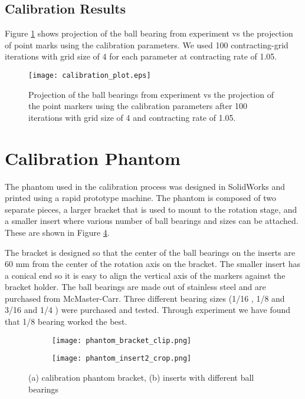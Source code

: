 \subsection{Calibration Results}
Figure \ref{fig:calibration_plot} shows projection of the ball bearing from experiment vs the projection of point marks using the calibration parameters.  We used 100 contracting-grid iterations with grid size of 4 for each parameter at contracting rate of 1.05.

\begin{figure}[ht]
\texttt{[image: calibration\_plot.eps]}
\label{fig:calibration_plot}
\caption{Projection of the ball bearings from experiment vs the projection of the point markers using the calibration parameters after 100 iterations with grid size of 4 and contracting rate of 1.05.}
\end{figure}


\section{Calibration Phantom}
The phantom used in the calibration process was designed in SolidWorks and printed using a rapid prototype machine.  The phantom is composed of two separate pieces, a larger bracket that is used to mount to the rotation stage, and a smaller insert where various number of ball bearings and sizes can be attached.  These are shown in Figure \ref{fig:calibration_phantom}.

The bracket is designed so that the center of the ball bearings on the inserts are 60 mm from the center of the rotation axis on the bracket.  The smaller insert has a conical end so it is easy to align the vertical axis of the markers against the bracket holder.  The ball bearings are made out of stainless steel and are purchased from McMaster-Carr.  Three different bearing sizes (1/16 \inches, 1/8 \inches and 3/16 \inches and 1/4 \inches) were purchased and tested.  Through experiment we have found that 1/8 \inches bearing worked the best.
\begin{figure}[ht]
	\begin{subfigure}[b]{0.3\linewidth}
	\texttt{[image: phantom\_bracket\_clip.png]}
	\label{fig:calibration_phantom_bracket}
	\caption{}
	\end{subfigure}
\hspace{0.2cm}
	\begin{subfigure}[b]{0.3\linewidth}
	\texttt{[image: phantom\_insert2\_crop.png]}
	\label{fig:calibration_phantom_insert}
	\caption{}
	\end{subfigure}
\caption{(a) calibration phantom bracket, (b) inserts with different ball bearings}
\label{fig:calibration_phantom}
\end{figure}

